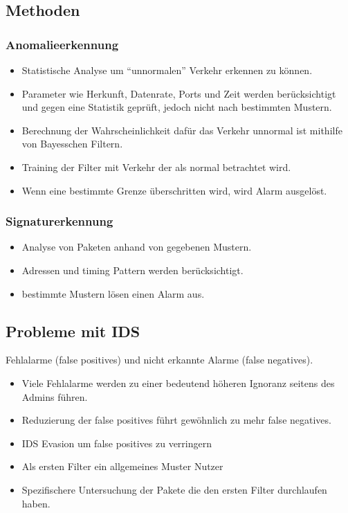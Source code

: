 \documentclass{article} %
\begin{document}
\subsection{Methoden}
\subsubsection{Anomalieerkennung}
\begin{itemize}
	\item Statistische Analyse um "`unnormalen"' Verkehr erkennen zu können.
	\item Parameter wie Herkunft, Datenrate, Ports und Zeit werden berücksichtigt und gegen eine Statistik geprüft, jedoch nicht nach bestimmten Mustern.
	\item Berechnung der Wahrscheinlichkeit dafür das Verkehr unnormal ist mithilfe von Bayesschen Filtern.
	\item Training der Filter mit Verkehr der als normal betrachtet wird.
	\item Wenn eine bestimmte Grenze überschritten wird, wird Alarm ausgelöst.
\end{itemize}
\subsubsection{Signaturerkennung}
\begin{itemize}
	\item Analyse von Paketen anhand von gegebenen Mustern.
	\item Adressen und timing Pattern werden berücksichtigt.
	\item bestimmte Mustern lösen einen Alarm aus.	
\end{itemize}

\subsection{Probleme mit IDS}
Fehlalarme (false positives) und nicht erkannte Alarme (false negatives).
\begin{itemize}
	\item Viele Fehlalarme werden zu einer bedeutend höheren Ignoranz seitens des Admins führen.
    \item Reduzierung der false positives führt gewöhnlich zu mehr false negatives.
    \item IDS Evasion um false positives zu verringern
    \item Als ersten Filter ein allgemeines Muster Nutzer
    \item Spezifischere Untersuchung der Pakete die den ersten Filter durchlaufen haben.
\end{itemize}
\end{document}

